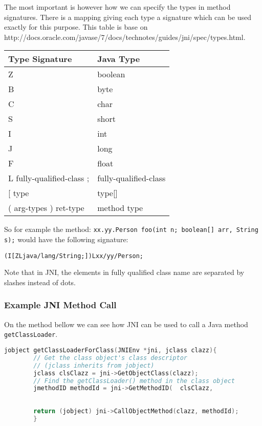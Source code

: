The most important is however how we can specify the types in method signatures. There is a mapping giving each type a signature which can be used exactly for this purpose. This table is base on http://docs.oracle.com/javase/7/docs/technotes/guides/jni/spec/types.html.
\begin{center}
\begin{tabular}{ l l }
	  \hline
	  Type Signature & Java Type \\ \hline
	Z & boolean \\
	B & byte \\
	C & char \\
	S & short \\
	I & int \\
	J & long \\
	F & float \\
	L fully-qualified-class ; & fully-qualified-class \\
	{[} type & type{[]}\ \\
	( arg-types ) ret-type & method type \\
\end{tabular}
\end{center}

So for example the method: \newline \texttt{xx.yy.Person foo(int n; boolean[] arr, String s);}
would have the following signature:

\texttt{(I[ZLjava/lang/String;])Lxx/yy/Person;}

Note that in JNI, the elements in fully qualified class name are separated by slashes instead of dots.
\subsubsection{Example JNI Method Call}
On the method bellow we can see how JNI can be used to call a Java method \texttt{getClassLoader}.

\begin{lstlisting}[language=c++]
        jobject getClassLoaderForClass(JNIEnv *jni, jclass clazz){
        // Get the class object's class descriptor
        // (jclass inherits from jobject)
        jclass clsClazz = jni->GetObjectClass(clazz);
        // Find the getClassLoader() method in the class object
        jmethodID methodId = jni->GetMethodID(	clsClazz,
																         "getClassLoader",
																         "()Ljava/lang/ClassLoader;");
        return (jobject) jni->CallObjectMethod(clazz, methodId);
        }
\end{lstlisting}

